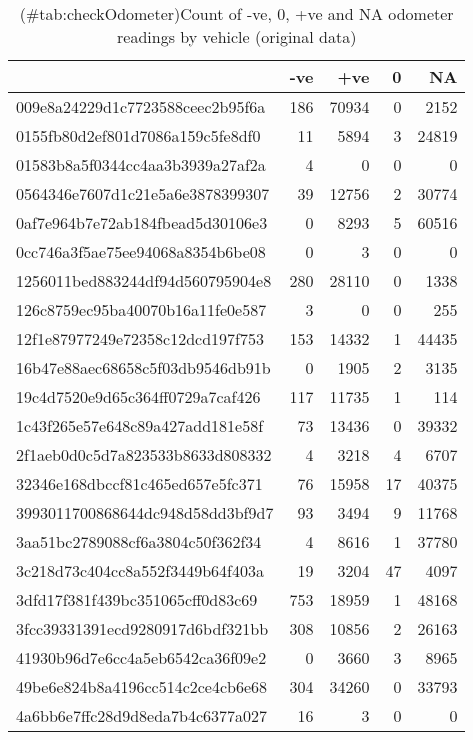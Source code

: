 \documentclass[]{article}
\begin{document}
\begin{table}[t]

\caption{(\#tab:checkOdometer)Count of -ve, 0, +ve and NA odometer readings by vehicle (original data)}
\centering
\begin{tabular}{l|r|r|r|r}
\hline
  & -ve & +ve & 0 & NA\\
\hline
009e8a24229d1c7723588ceec2b95f6a & 186 & 70934 & 0 & 2152\\
\hline
0155fb80d2ef801d7086a159c5fe8df0 & 11 & 5894 & 3 & 24819\\
\hline
01583b8a5f0344cc4aa3b3939a27af2a & 4 & 0 & 0 & 0\\
\hline
0564346e7607d1c21e5a6e3878399307 & 39 & 12756 & 2 & 30774\\
\hline
0af7e964b7e72ab184fbead5d30106e3 & 0 & 8293 & 5 & 60516\\
\hline
0cc746a3f5ae75ee94068a8354b6be08 & 0 & 3 & 0 & 0\\
\hline
1256011bed883244df94d560795904e8 & 280 & 28110 & 0 & 1338\\
\hline
126c8759ec95ba40070b16a11fe0e587 & 3 & 0 & 0 & 255\\
\hline
12f1e87977249e72358c12dcd197f753 & 153 & 14332 & 1 & 44435\\
\hline
16b47e88aec68658c5f03db9546db91b & 0 & 1905 & 2 & 3135\\
\hline
19c4d7520e9d65c364ff0729a7caf426 & 117 & 11735 & 1 & 114\\
\hline
1c43f265e57e648c89a427add181e58f & 73 & 13436 & 0 & 39332\\
\hline
2f1aeb0d0c5d7a823533b8633d808332 & 4 & 3218 & 4 & 6707\\
\hline
32346e168dbccf81c465ed657e5fc371 & 76 & 15958 & 17 & 40375\\
\hline
3993011700868644dc948d58dd3bf9d7 & 93 & 3494 & 9 & 11768\\
\hline
3aa51bc2789088cf6a3804c50f362f34 & 4 & 8616 & 1 & 37780\\
\hline
3c218d73c404cc8a552f3449b64f403a & 19 & 3204 & 47 & 4097\\
\hline
3dfd17f381f439bc351065cff0d83c69 & 753 & 18959 & 1 & 48168\\
\hline
3fcc39331391ecd9280917d6bdf321bb & 308 & 10856 & 2 & 26163\\
\hline
41930b96d7e6cc4a5eb6542ca36f09e2 & 0 & 3660 & 3 & 8965\\
\hline
49be6e824b8a4196cc514c2ce4cb6e68 & 304 & 34260 & 0 & 33793\\
\hline
4a6bb6e7ffc28d9d8eda7b4c6377a027 & 16 & 3 & 0 & 0\\

\end{tabular}
\end{table}
\end{document}
